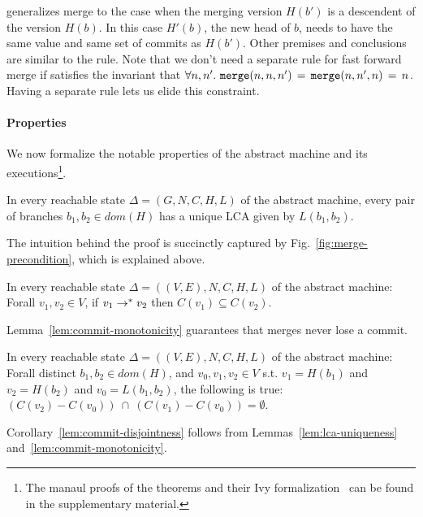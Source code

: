  generalizes merge to the case when the merging
version $H(b')$ is a descendent of the version $H(b)$. In this case
$H'(b)$, the new head of $b$, needs to have the same value and same
set of commits as $H(b')$. Other premises and conclusions are similar
to the  rule. Note that we don't need a separate rule
for fast forward merge if  satisfies the invariant that
$\forall n, n'.~ {\tt merge}(n,n,n') \,=\, {\tt merge}(n,n',n) \,=\, n$.
Having a separate rule lets us elide this constraint.

\paragraph{Properties} We now formalize the notable properties of the
abstract machine and its executions\footnote{
  The manaul proofs of the theorems and their Ivy
  formalization~\cite{ivy} can be found in the supplementary material.
}. 

\begin{lemma}
  \label{lem:lca-uniqueness}
  In every reachable state $\Delta = (G,N,C,H,L)$ of the abstract
  machine, every pair of branches $b_1, b_2 \in dom(H)$ has a unique
  LCA given by $L(b_1,b_2)$.
\end{lemma}

The intuition behind the proof is succinctly captured by
Fig.~\ref{fig:merge-precondition}, which is explained above.

\begin{lemma}
  \label{lem:commit-monotonicity}
  In every reachable state $\Delta = ((V,E),N,C,H,L)$ of the abstract
  machine: Forall $v_1,v_2 \in V$, if $v_1 \rightarrow^{*} v_2$ then $C(v_1)
  \subseteq C(v_2)$.
\end{lemma}

Lemma~\ref{lem:commit-monotonicity} guarantees that merges never lose
a commit.

\begin{corollary}
  \label{lem:commit-disjointness}
  In every reachable state $\Delta = ((V,E),N,C,H,L)$ of the abstract
  machine: Forall distinct $b_1, b_2 \in dom(H)$, and $v_0, v_1, v_2
  \in V$ s.t.  $v_1 = H(b_1)$ and $v_2 = H(b_2)$ and $v_0 =
  L(b_1,b_2)$, the following is true: $(C(v_2) - C(v_0)) ~\cap~
  (C(v_1) - C(v_0)) = \emptyset$.
\end{corollary}

Corollary~\ref{lem:commit-disjointness} follows from
Lemmas~\ref{lem:lca-uniqueness} and~\ref{lem:commit-monotonicity}.

